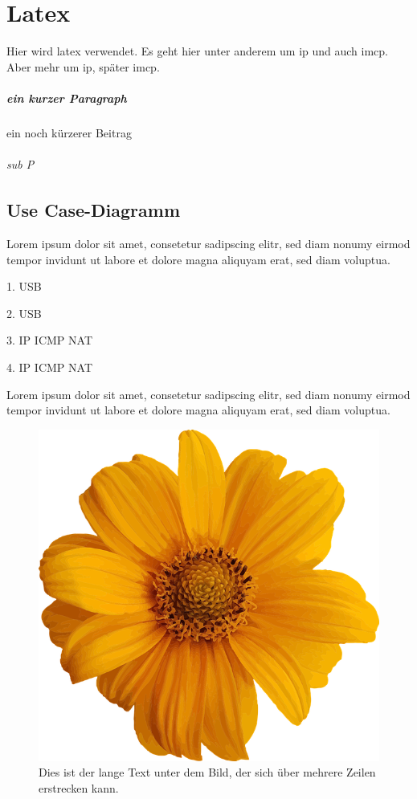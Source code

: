\chapter{Latex} 
Hier wird \gls{latex} verwendet. Es geht hier unter anderem um \gls{ip} und auch \gls{imcp}.
Aber mehr um \gls{ip}, später \gls{imcp}. 
\paragraph{ein kurzer Paragraph}
ein noch kürzerer Beitrag \par
\subparagraph{sub P} \par

\section{Use Case-Diagramm}
\cite{knuth-fa,knuth-acp} Lorem ipsum dolor sit amet, consetetur sadipscing elitr, sed diam nonumy eirmod tempor invidunt ut labore et dolore magna aliquyam erat, sed diam voluptua. \par
1. \ac{USB} \par
2. \ac{USB} \par
3. \ac{IP} \ac{ICMP} \ac{NAT} \par
4. \ac{IP} \ac{ICMP} \ac{NAT} \par

Lorem ipsum dolor sit amet, consetetur sadipscing elitr, sed diam nonumy eirmod tempor invidunt ut labore et dolore magna aliquyam erat, sed diam voluptua. 

\begin{figure}[htb]
	\centering
	\includegraphics[scale=0.2,]{img/sample-logo.png}
	\caption[Dies ist der kurze Text im Abb Verzeichnis]{Dies ist der lange Text unter dem Bild, der sich über mehrere Zeilen erstrecken kann.}
	\label{fig:my_label}
\end{figure}